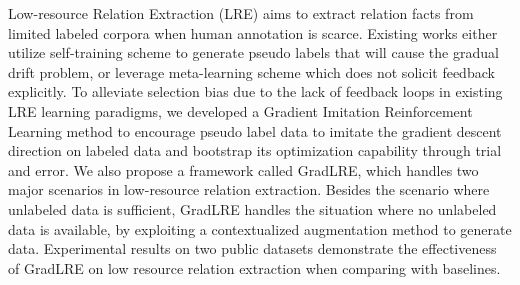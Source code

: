 Low-resource Relation Extraction (LRE) aims to extract relation facts from limited labeled corpora when human annotation is scarce. Existing works either utilize self-training scheme to generate pseudo labels that will cause the gradual drift problem, or leverage meta-learning scheme which does not solicit feedback explicitly. To alleviate selection bias due to the lack of feedback loops in existing LRE learning paradigms, we developed a Gradient Imitation Reinforcement Learning method to encourage pseudo label data to imitate the gradient descent direction on labeled data and bootstrap its optimization capability through trial and error. We also propose a framework called GradLRE, which handles two major scenarios in low-resource relation extraction. Besides the scenario where unlabeled data is sufficient, GradLRE handles the situation where no unlabeled data is available, by exploiting a contextualized augmentation method to generate data. Experimental results on two public datasets demonstrate the effectiveness of GradLRE on low resource relation extraction when comparing with baselines.
